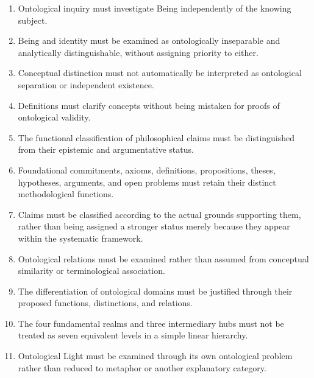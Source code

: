 \begin{enumerate}

    \item Ontological inquiry
    must investigate Being
    independently of the
    knowing subject.

    \item Being and identity
    must be examined as
    ontologically inseparable
    and analytically distinguishable,
    without assigning priority
    to either.

    \item Conceptual distinction
    must not automatically
    be interpreted as ontological
    separation or independent
    existence.

    \item Definitions must
    clarify concepts without
    being mistaken for proofs
    of ontological validity.

    \item The functional classification
    of philosophical claims
    must be distinguished from
    their epistemic and argumentative
    status.

    \item Foundational commitments,
    axioms, definitions,
    propositions, theses,
    hypotheses, arguments,
    and open problems must
    retain their distinct
    methodological functions.

    \item Claims must be classified
    according to the actual
    grounds supporting them,
    rather than being assigned
    a stronger status merely
    because they appear within
    the systematic framework.

    \item Ontological relations
    must be examined rather
    than assumed from conceptual
    similarity or terminological
    association.

    \item The differentiation
    of ontological domains
    must be justified through
    their proposed functions,
    distinctions, and relations.

    \item The four fundamental
    realms and three intermediary
    hubs must not be treated
    as seven equivalent levels
    in a simple linear hierarchy.

    \item Ontological Light
    must be examined through
    its own ontological problem
    rather than reduced to
    metaphor or another
    explanatory category.


\end{enumerate}

